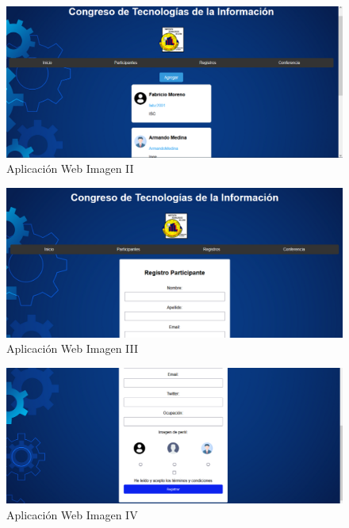 \begin{figure}[H]
	\centering
	\includegraphics[width=1\linewidth]{Imagenes/web2}
	\caption{Aplicación Web Imagen II}
	\label{fig:web2}
\end{figure}

\begin{figure}[H]
	\centering
	\includegraphics[width=1\linewidth]{Imagenes/web3}
	\caption{Aplicación Web Imagen III}
	\label{fig:web3}
\end{figure}

\begin{figure}[H]
	\centering
	\includegraphics[width=1\linewidth]{Imagenes/web4}
	\caption{Aplicación Web Imagen IV}
	\label{fig:web4}
\end{figure}

